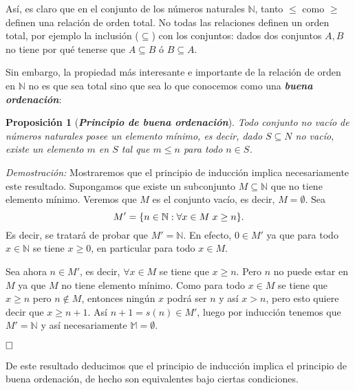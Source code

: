 \documentclass[12pt]{article}
\newtheorem{proposition}[theorem]{Proposición}
\begin{document}
Así, es claro que en el conjunto de los números naturales $\mathbb{N}$, tanto $\leq$ como $\geq$ definen una relación de orden total. No todas las relaciones definen un orden total, por ejemplo la inclusión ($\subseteq$) con los conjuntos: dados dos conjuntos $A,B$ no tiene por qué tenerse que $A \subseteq B$ ó $B \subseteq A$.

Sin embargo, la propiedad más interesante e importante de la relación de orden en $\mathbb{N}$ no es que sea total sino que sea lo que conocemos como una \textbf{\textit{buena ordenación}}:
\begin{proposition}[\textbf{\textit{Principio de buena ordenación}}]Todo conjunto no vacío de números naturales posee un elemento mínimo, es decir, dado $S \subseteq N$ no vacío, existe un elemento $m$ en $S$ tal que $m \leq n$ para todo $n \in S$.
\end{proposition}
\emph{Demostración: }Mostraremos que el principio de inducción implica necesariamente este resultado. Supongamos que existe un subconjunto $M \subseteq \mathbb{N}$ que no tiene elemento mínimo. Veremos que $M$ es el conjunto vacío, es decir, $M = \emptyset$. Sea $$M' = \lbrace n \in \mathbb{N}: \forall x \in M\hspace{0.1cm} x \geq n \rbrace.$$ Es decir, se tratará de probar que $M'= \mathbb{N}$. En efecto, $0 \in M'$ ya que para todo $x \in \mathbb{N}$ se tiene $x \geq 0$, en particular para todo $x \in M$. 

Sea ahora $n \in M'$, es decir, $\forall x \in M$ se tiene que $x \geq n$. Pero $n$ no puede estar en $M$ ya que $M$ no tiene elemento mínimo. Como para todo $x \in M$ se tiene que $x \geq n$ pero $n \notin M$, entonces ningún $x$ podrá ser $n$ y así $x>n$, pero esto quiere decir que $x \geq n+1$. Así $n+1 =s(n) \in M'$, luego por inducción tenemos que $M' = \mathbb{N}$ y así necesariamente $\mathbb{M} = \emptyset$.

$\hfill \square$

De este resultado deducimos que el principio de inducción implica el principio de buena ordenación, de hecho son equivalentes bajo ciertas condiciones.
\end{document}

